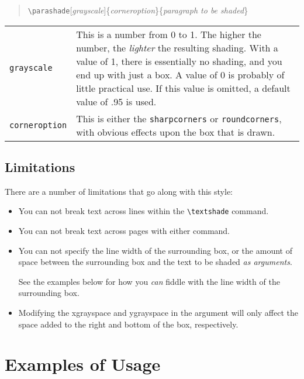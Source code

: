 {\begin{quote}
    \verb|\parashade|[{\em grayscale}]\{{\em corneroption}\}\{{\em paragraph
        to be shaded}\}
  \end{quote}


  \begin{tabular}{lp{4.5in}}
  {\tt grayscale} & This is a number from 0 to 1.  The higher the number,
                  the {\em lighter} the resulting shading.  With a value
                  of 1, there is essentially no shading, and you end up
                  with just a box.  A value of 0 is probably of little
                  practical use.  If this value is omitted, a default
                  value of .95 is used. \\
  {\tt corneroption} &   This is either the {\tt sharpcorners} or
                    {\tt roundcorners}, with obvious effects upon the box
                    that is drawn. \\
  \end{tabular}


\subsection{Limitations}
  There are a number of limitations that go along with this style:

  \begin{itemize}

    \item You can not break text across lines within the \verb|\textshade|
      command.

    \item You can not break text across pages with either command.

    \item You can not specify the line width of the surrounding box, or
      the amount of space between the surrounding box and the text to
      be shaded {\em as arguments}.

      See the examples below for how you {\em can}
      fiddle with the line width of the surrounding box.

    \item Modifying the xgrayspace and ygrayspace in the argument
      will only affect the space added to the right and
      bottom of the box, respectively.

  \end{itemize}

\section{Examples of Usage}

}
